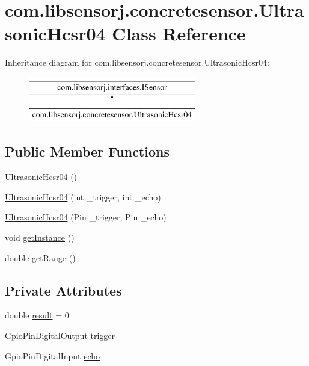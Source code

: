 \hypertarget{classcom_1_1libsensorj_1_1concretesensor_1_1UltrasonicHcsr04}{}\section{com.\+libsensorj.\+concretesensor.\+Ultrasonic\+Hcsr04 Class Reference}
\label{classcom_1_1libsensorj_1_1concretesensor_1_1UltrasonicHcsr04}
Inheritance diagram for com.\+libsensorj.\+concretesensor.\+Ultrasonic\+Hcsr04\+:\begin{figure}[H]
\begin{center}
\leavevmode
\includegraphics[height=2.000000cm]{classcom_1_1libsensorj_1_1concretesensor_1_1UltrasonicHcsr04}
\end{center}
\end{figure}
\subsection*{Public Member Functions}
\begin{DoxyCompactItemize}
\item 
\hyperlink{classcom_1_1libsensorj_1_1concretesensor_1_1UltrasonicHcsr04_a7e02068d9acb1b3cf1d15d45afbf377b}{Ultrasonic\+Hcsr04} ()
\item 
\hyperlink{classcom_1_1libsensorj_1_1concretesensor_1_1UltrasonicHcsr04_a2304a7d1085f3c1d122d35299ed25ed5}{Ultrasonic\+Hcsr04} (int \+\_\+trigger, int \+\_\+echo)
\item 
\hyperlink{classcom_1_1libsensorj_1_1concretesensor_1_1UltrasonicHcsr04_a80adba05f0dbb21f53a02d8e890d06ba}{Ultrasonic\+Hcsr04} (Pin \+\_\+trigger, Pin \+\_\+echo)
\item 
void \hyperlink{classcom_1_1libsensorj_1_1concretesensor_1_1UltrasonicHcsr04_a170167614b330d79518647a9a9722b62}{get\+Instance} ()
\item 
double \hyperlink{classcom_1_1libsensorj_1_1concretesensor_1_1UltrasonicHcsr04_aec68f4aadd8faa618025dfa37c89c696}{get\+Range} ()
\end{DoxyCompactItemize}
\subsection*{Private Attributes}
\begin{DoxyCompactItemize}
\item 
double \hyperlink{classcom_1_1libsensorj_1_1concretesensor_1_1UltrasonicHcsr04_aad32f417f9106fa8f3f2e2a7416f033b}{result} = 0
\item 
Gpio\+Pin\+Digital\+Output \hyperlink{classcom_1_1libsensorj_1_1concretesensor_1_1UltrasonicHcsr04_a13705a8251de22d0f52caa3e17d23376}{trigger}
\item 
Gpio\+Pin\+Digital\+Input \hyperlink{classcom_1_1libsensorj_1_1concretesensor_1_1UltrasonicHcsr04_a3695a560e3157a5e6f7896532d717456}{echo}
\end{DoxyCompactItemize}
